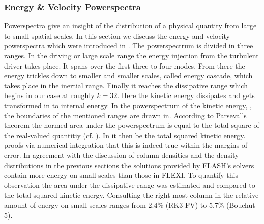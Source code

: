 


\subsubsection{Energy \& Velocity Powerspectra}
\label{sec:stirturb-pws}
Powerspectra give an insight of the distribution of a physical quantity from large to
small spatial scales. In this section we discuss the energy and velocity powerspectra
which were introduced in . The powerspectrum is
divided in three ranges. In the driving or large scale range the energy
injection from the turbulent driver takes place. It spans over the first three
to four modes.  From there the energy trickles down to smaller and smaller
scales, called energy cascade, which takes place in the inertial range. Finally
it reaches the dissipative range which begins in our case at roughly $k = 32$.
Here the kinetic energy dissipates and gets transformed in to internal energy.
In the powerspectrum of the kinetic energy,
, the boundaries of the
mentioned ranges are drawn in. According to Parseval's theorem the normed area
under the powerspectrum is equal to the total square of the real-valued
quantitiy (cf. ). In
 it then be the total
squared kinetic energy.  proofs via numerical integration
that this is indeed true within the margins of error.  In agreement with the
discussion of column densities and the density distributions in the previous
sections the solutions provided by FLASH's solvers contain more energy on small
scales than those in FLEXI. To quantify this observation the area under the 
dissipative range was estimated and compared to the total squared kinetic energy.
Consulting the right-most column in  the relative amount of
energy on small scales ranges from 2.4\% (RK3 FV) to 5.7\% (Bouchut 5).

